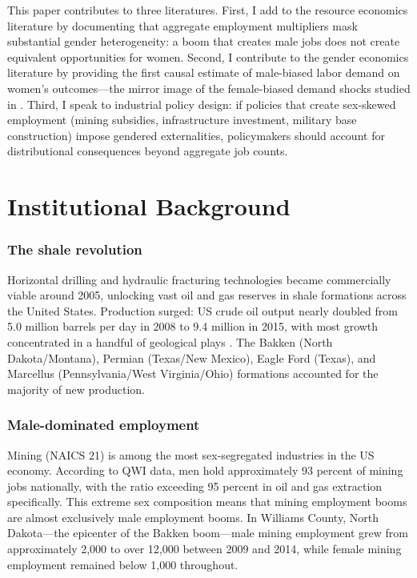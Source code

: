 \documentclass[12pt]{article}
\begin{document}
This paper contributes to three literatures. First, I add to the resource economics literature \citep{Feyrer2017, Bartik2019, Allcott2018} by documenting that aggregate employment multipliers mask substantial gender heterogeneity: a boom that creates male jobs does not create equivalent opportunities for women. Second, I contribute to the gender economics literature \citep{Aizer2010, Bertrand2010, Goldin2014} by providing the first causal estimate of male-biased labor demand on women's outcomes---the mirror image of the female-biased demand shocks studied in \citet{Aizer2010}. Third, I speak to industrial policy design: if policies that create sex-skewed employment (mining subsidies, infrastructure investment, military base construction) impose gendered externalities, policymakers should account for distributional consequences beyond aggregate job counts.

\section{Institutional Background}

\subsubsection*{The shale revolution} Horizontal drilling and hydraulic fracturing technologies became commercially viable around 2005, unlocking vast oil and gas reserves in shale formations across the United States. Production surged: US crude oil output nearly doubled from 5.0 million barrels per day in 2008 to 9.4 million in 2015, with most growth concentrated in a handful of geological plays \citep{EIA2023}. The Bakken (North Dakota/Montana), Permian (Texas/New Mexico), Eagle Ford (Texas), and Marcellus (Pennsylvania/West Virginia/Ohio) formations accounted for the majority of new production.

\subsubsection*{Male-dominated employment} Mining (NAICS 21) is among the most sex-segregated industries in the US economy. According to QWI data, men hold approximately 93 percent of mining jobs nationally, with the ratio exceeding 95 percent in oil and gas extraction specifically. This extreme sex composition means that mining employment booms are almost exclusively male employment booms. In Williams County, North Dakota---the epicenter of the Bakken boom---male mining employment grew from approximately 2,000 to over 12,000 between 2009 and 2014, while female mining employment remained below 1,000 throughout.
\end{document}
